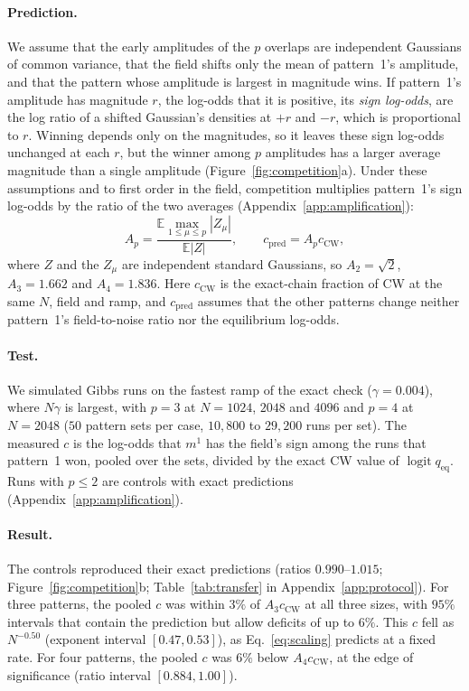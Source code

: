 \documentclass[final]{dynafront2026}
\newcommand{\qeq}{q_{\mathrm{eq}}}
\DeclareMathOperator{\logit}{logit}
\begin{document}
\paragraph{Prediction.}
We assume that the early amplitudes of the $p$ overlaps are independent
Gaussians of common variance, that
the field shifts only the mean of pattern~1's amplitude, and that the pattern
whose amplitude is largest in magnitude wins. If pattern~1's
amplitude has magnitude $r$, the log-odds that it is positive, its \emph{sign
log-odds}, are the log ratio of a shifted Gaussian's densities at $+r$
and $-r$, which is proportional to $r$. Winning depends only on the magnitudes, so it leaves
these sign log-odds unchanged at each $r$, but the winner among $p$
amplitudes has a larger average magnitude than a single amplitude
(Figure~\ref{fig:competition}a). Under these assumptions and to first order
in the field, competition multiplies pattern~1's sign log-odds by the ratio
of the two averages (Appendix~\ref{app:amplification}):
\begin{equation}
 A_p=\frac{\mathbb E\max_{1\le\mu\le p}|Z_\mu|}{\mathbb E|Z|},
 \qquad c_{\mathrm{pred}}=A_p c_{\mathrm{CW}},
 \label{eq:amplification}
\end{equation}
where $Z$ and the $Z_\mu$ are independent standard Gaussians, so
$A_2=\sqrt2$, $A_3=1.662$ and $A_4=1.836$. Here $c_{\mathrm{CW}}$ is the
exact-chain fraction of CW at the same $N$, field and ramp, and
$c_{\mathrm{pred}}$ assumes that the other patterns change neither
pattern~1's field-to-noise ratio nor the equilibrium log-odds.

\paragraph{Test.}
We simulated Gibbs runs on the fastest ramp of the exact check
($\gamma=0.004$), where $N\gamma$ is largest, with $p=3$ at $N=1024$, $2048$ and $4096$ and $p=4$ at $N=2048$ ($50$
pattern sets per case, $10{,}800$ to $29{,}200$ runs per set). The measured $c$ is the log-odds that $m^1$ has the field's
sign among the runs that pattern~1 won, pooled over the sets, divided by the
exact CW value of $\logit\qeq$. Runs with $p\le2$ are controls with exact predictions
(Appendix~\ref{app:amplification}).

\paragraph{Result.}
The controls reproduced their exact predictions (ratios $0.990$--$1.015$;
Figure~\ref{fig:competition}b; Table~\ref{tab:transfer} in
Appendix~\ref{app:protocol}). For three patterns,
the pooled $c$ was within $3\%$ of $A_3c_{\mathrm{CW}}$ at all three sizes,
with $95\%$ intervals that contain the prediction but allow deficits of up to
$6\%$. This $c$ fell as $N^{-0.50}$ (exponent interval $[0.47,0.53]$), as
Eq.~\eqref{eq:scaling} predicts at a fixed rate. For four patterns, the
pooled $c$ was $6\%$ below $A_4c_{\mathrm{CW}}$, at the edge of significance
(ratio interval $[0.884,1.00]$).
\end{document}
